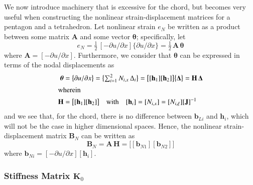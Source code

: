 We now introduce machinery that is excessive for the chord, but becomes very useful when constructing the nonlinear strain-displacement matrices for a pentagon and a tetrahedron.  Let nonlinear strain $e_N$ be written as a product between some matrix $\mathbf{A}$ and some vector $\boldsymbol{\theta}$; specifically, let
\begin{equation}
e_ N =  \tfrac{1}{2} \,
[-\partial u / \partial x ]
\{\partial u / \partial x\}
= \tfrac{1}{2} \, \mathbf{A} \, \boldsymbol{\theta} 
\end{equation}
where $\mathbf{A} = [ -\partial u / \partial x ]$.  Furthermore, we consider that $\boldsymbol{\theta}$ can be expressed in terms of the nodal displacements as
\begin{subequations}
    \begin{align}
    \boldsymbol{\theta} & =  \bigl\{
    \partial u / \partial x
    \bigr\}
    = \bigl\{ \begin{matrix}
    \sum\nolimits_{i=1}^2 N_{i,x} \, \Delta_i
    \end{matrix} \bigr\}
    = \bigl[ [\mathbf{h}_1] [\mathbf{h}_2] \bigr] 
    \bigl\{ \boldsymbol{\Delta} \bigr\}
    = \mathbf{H} \, \boldsymbol{\Delta} \\
    \intertext{wherein}
    \mathbf{H} & = \bigl[ [\mathbf{h}_1] [\mathbf{h}_2] \bigr]
    \quad \text{with} \quad
    [\mathbf{h}_i] = [N_{i,x}] = [N_{i,\xi}] [ \mathbf{J}]^{-1}
    \end{align}
\end{subequations}
and we see that, for the chord, there is no difference between $\mathbf{b}_{Li}$ and $\mathbf{h}_i$, which will not be the case in higher dimensional spaces.  Hence, the nonlinear strain-displacement matrix $\mathbf{B}_N$ can be written as
\begin{equation}
    \mathbf{B}_N = \mathbf{A} \, \mathbf{H}  =  
    \bigl[ [\mathbf{b}_{N1}] [\mathbf{b}_{N2}] \bigr]
\end{equation}
where $\mathbf{b}_{Ni} = [-\partial u / \partial x] [ \mathbf{h}_i ]$.

\subsubsection{Stiffness Matrix $\mathbf{K}_0$}

